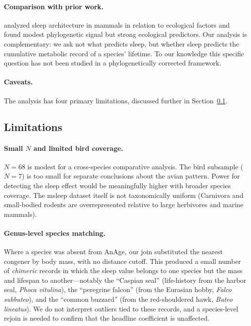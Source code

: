 \documentclass{article}
\begin{document}
\paragraph{Comparison with prior work.}
\citet{lesku2006} analyzed sleep architecture in mammals in relation to ecological
factors and found modest phylogenetic signal but strong ecological predictors. Our
analysis is complementary: we ask not what predicts sleep, but whether sleep predicts
the cumulative metabolic record of a species' lifetime. To our knowledge this specific
question has not been studied in a phylogenetically corrected framework.

\paragraph{Caveats.}
The analysis has four primary limitations, discussed further in
Section~\ref{sec:limitations}.

\subsection{Limitations}
\label{sec:limitations}

\paragraph{Small $N$ and limited bird coverage.}
$N = 68$ is modest for a cross-species comparative analysis. The bird subsample ($N = 7$)
is too small for separate conclusions about the avian pattern. Power for detecting the
sleep effect would be meaningfully higher with broader species coverage. The msleep
dataset itself is not taxonomically uniform (Carnivora and small-bodied rodents are
overrepresented relative to large herbivores and marine mammals).

\paragraph{Genus-level species matching.}
Where a species was absent from AnAge, our join substituted the nearest congener by
body mass, with no distance cutoff. This produced a small number of \emph{chimeric}
records in which the sleep value belongs to one species but the mass and lifespan to
another---notably the ``Caspian seal'' (life-history from the harbor seal,
\emph{Phoca vitulina}), the ``peregrine falcon'' (from the Eurasian hobby,
\emph{Falco subbuteo}), and the ``common buzzard'' (from the red-shouldered hawk,
\emph{Buteo lineatus}). We do not interpret outliers tied to these records, and a
species-level rejoin is needed to confirm that the headline coefficient is unaffected.
\end{document}
